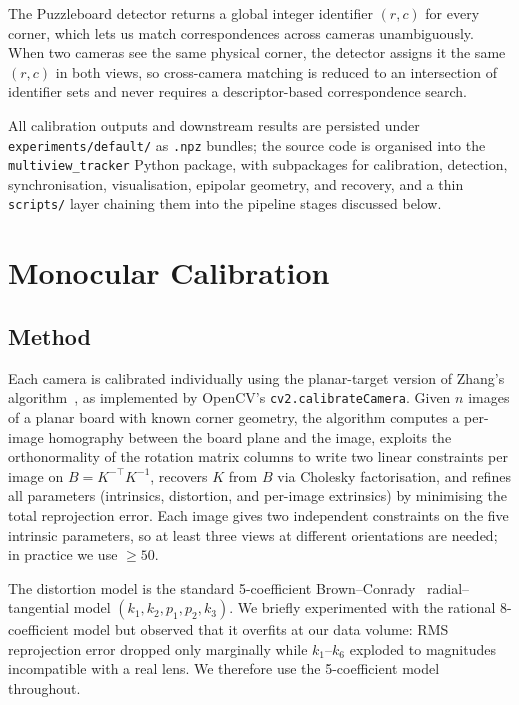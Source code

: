 \documentclass[twocolumn]{article}
\begin{document}
The Puzzleboard detector returns a global integer identifier $(r, c)$
for every corner, which lets us match correspondences across cameras
unambiguously. When two cameras see the same physical corner, the
detector assigns it the same $(r, c)$ in both views, so cross-camera
matching is reduced to an intersection of identifier sets and never
requires a descriptor-based correspondence search.

All calibration outputs and downstream results are persisted under
\texttt{experiments/default/} as \texttt{.npz} bundles; the source
code is organised into the \texttt{multiview\_tracker} Python package,
with subpackages for calibration, detection, synchronisation,
visualisation, epipolar geometry, and recovery, and a thin
\texttt{scripts/} layer chaining them into the pipeline stages
discussed below.

\section{Monocular Calibration}
\label{sec:calibration}

\subsection{Method}

Each camera is calibrated individually using the planar-target version
of Zhang's algorithm~\cite{zhang2000}, as implemented by OpenCV's
\texttt{cv2.calibrateCamera}. Given $n$ images of a planar board with
known corner geometry, the algorithm computes a per-image homography
between the board plane and the image, exploits the orthonormality of
the rotation matrix columns to write two linear constraints per image
on $B = K^{-\top} K^{-1}$, recovers $K$ from $B$ via Cholesky
factorisation, and refines all parameters (intrinsics, distortion,
and per-image extrinsics) by minimising the total reprojection error.
Each image gives two independent constraints on the five intrinsic
parameters, so at least three views at different orientations are
needed; in practice we use $\geq 50$.

The distortion model is the standard 5-coefficient
Brown--Conrady~\cite{brown1971} radial--tangential model
$(k_1, k_2, p_1, p_2, k_3)$. We briefly experimented with the rational
8-coefficient model but observed that it overfits at our data volume:
RMS reprojection error dropped only marginally while $k_1$--$k_6$
exploded to magnitudes incompatible with a real lens. We therefore use
the 5-coefficient model throughout.
\end{document}
